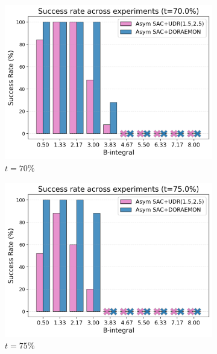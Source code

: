     
\begin{figure}
    \centering
    \begin{subfigure}{0.32\textwidth}
        \centering
        \includegraphics[width=\linewidth]{images/doraemon_vs_udr_succ_rate_70.png}
        \caption{ \( t = 70 \% \) }
        \label{fig:succ_rate_70}
    \end{subfigure}
    \hfill
    \begin{subfigure}{0.32\textwidth}
        \centering
        \includegraphics[width=\linewidth]{images/doraemon_vs_udr_succ_rate_75.png}
        \caption{\( t = 75 \% \)} 
        \label{fig:succ_rate_75}
    \end{subfigure}
    \hfill
    \begin{subfigure}{0.32\textwidth}

\end{subfigure}
\end{figure}
